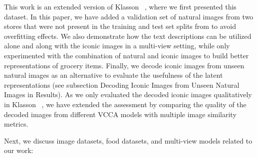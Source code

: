 This work is an extended version of Klasson \etal~, where we first presented this dataset. In this paper, we have added a validation set of natural images from two stores that were not present in the training and test set splits from  to avoid overfitting effects. We also demonstrate how the text descriptions can be utilized alone and along with the iconic images in a multi-view setting, while  only experimented with the combination of natural and iconic images to build better representations of grocery items. Finally, we decode iconic images from unseen natural images as an alternative to evaluate the usefulness of the latent representations (see subsection Decoding Iconic Images from Unseen Natural Images in Results).
As we only evaluated the decoded iconic images qualitatively in Klasson \etal~, we have extended the assessment by comparing the quality of the decoded images from different VCCA models with multiple image similarity metrics. 

Next, we discuss image datasets, food datasets, and multi-view models related to our work:

